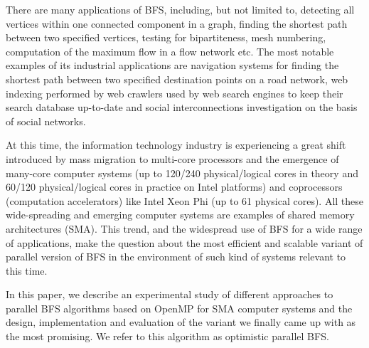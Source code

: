 \documentclass[letterpaper]{article}
\begin{document}
		There are many applications of BFS, including, but not limited to, detecting all vertices within one connected component in a graph, finding the shortest path between two specified vertices, testing for bipartiteness, mesh numbering, computation of the maximum flow in a flow network etc.
		The most notable examples of its industrial applications are navigation systems for finding the shortest path between two specified destination points on a road network, web indexing performed by web crawlers used by web search engines to keep their search database up-to-date and social interconnections investigation on the basis of social networks. %
		
		At this time, the information technology industry is experiencing a great shift introduced by mass migration to multi-core processors and the emergence of many-core computer systems (up to 120/240 physical/logical cores in theory and 60/120 physical/logical cores in practice on Intel platforms) and coprocessors (computation accelerators) like Intel Xeon Phi (up to 61 physical cores).
		All these wide-spreading and emerging computer systems are examples of shared memory architectures (SMA).
		This trend, and the widespread use of BFS for a wide range of applications, make the question about the most efficient and scalable variant of parallel version of BFS in the environment of such kind of systems relevant to this time.
		
		In this paper, we describe an experimental study of different approaches to parallel BFS algorithms based on OpenMP for SMA computer systems and the design, implementation and evaluation of the variant we finally came up with as the most promising.
		We refer to this algorithm as optimistic parallel BFS.
		
\end{document}
